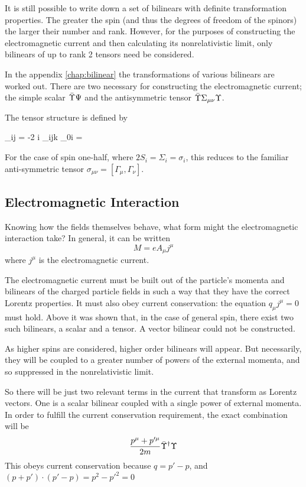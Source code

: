 It is still possible to write down a set of bilinears with definite transformation properties.  The greater the spin (and thus the degrees of freedom of the spinors) the larger their number and rank.  However, for the purposes of constructing the electromagnetic current and then calculating its nonrelativistic limit, only bilinears of up to rank 2 tensors need be considered.

In the appendix \ref{chap:bilinear} the transformations of various bilinears are worked out.  There are two necessary for constructing the electromagnetic current; the simple scalar $\bar{\Upsilon} \Psi$ and the antisymmetric tensor $\bar{\Upsilon} \Sigma_{\mu\nu} \Upsilon$.

The tensor structure is defined by

\beq \label{eq:Sg:SigDef}
	\Sigma_{ij} = -2 i \epsilon_{ijk} 
\eeq
\beq 
	\Sigma_{0i} = 
\eeq
 
For the case of spin one-half, where $2S_i = \Sigma_i = \sigma_i$, this reduces to the familiar anti-symmetric tensor $\sigma_{\mu\nu} = [\Gamma_\mu, \Gamma_\nu]$.
%

\subsection{Electromagnetic Interaction}
Knowing how the fields themselves behave, what form might the electromagnetic interaction take?  In general, it can be written
\[
	M = e A_\mu j^\mu 
\]
where $j^\mu$ is the electromagnetic current.


The electromagnetic current must be built out of the particle's momenta and bilinears of the charged particle fields in such a way that they have the correct Lorentz properties.  It must also obey current conservation: the equation $q_\mu j^\mu = 0$ must hold.  Above it was shown that, in the case of general spin, there exist two such bilinears, a scalar and a tensor.  A vector bilinear could not be constructed.

As higher spins are considered, higher order bilinears will appear.  But necessarily, they will be coupled to a greater number of powers of the external momenta, and so suppressed in the nonrelativistic limit.

So there will be just two relevant terms in the current that transform as Lorentz vectors.  One is a scalar bilinear coupled with a single power of external momenta.  In order to fulfill the current conservation requirement, the exact combination will be
\[
	\frac{p^\mu + p'^\mu}{2m} \bar{\Upsilon}^\dagger \Upsilon
\]
This obeys current conservation because $q = p' -p$, and $ (p+p')\cdot(p'-p) = p^2-p'^2=0$

